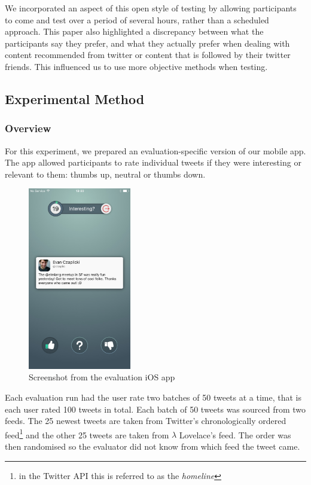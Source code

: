 \documentclass{article}
\begin{document}
We incorporated an aspect of this open style of testing by allowing participants to come and test over a period of several hours, rather than a scheduled approach. This paper also highlighted a discrepancy between what the participants say they prefer, and what they actually prefer when dealing with content recommended from twitter or content that is followed by their twitter friends. This influenced us to use more objective methods when testing.




\subsection{Experimental Method}
\subsubsection*{Overview} 







For this experiment, we prepared an evaluation-specific version of our mobile app. The app allowed participants to rate individual tweets if they were interesting or relevant to them: thumbs up, neutral or thumbs down.

\begin{figure}[H]
    \includegraphics[width=0.4\textwidth, center]{eval1}
    \caption{Screenshot from the evaluation iOS app}
\end{figure}

Each evaluation run had the user rate two batches of 50 tweets at a time, that is each user rated 100 tweets in total. Each batch of 50 tweets was sourced from two feeds. The 25 newest tweets are taken from Twitter's chronologically ordered feed\footnote{in the Twitter API this is referred to as the \textit{homeline}} and the other 25 tweets are taken from $\lambda$ Lovelace's feed. The order was then randomised so the evaluator did not know from which feed the tweet came.
\end{document}
